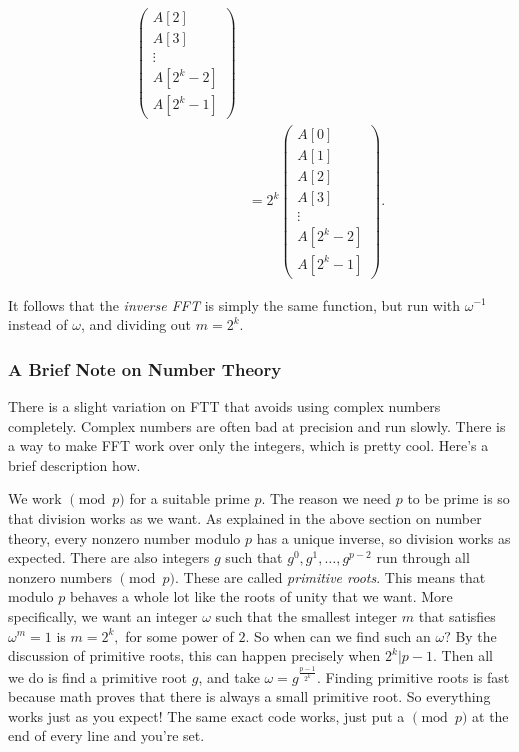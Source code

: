 \begin{align*}
\begin{pmatrix}
A[2] \\ 
A[3] \\
\vdots \\
A[2^k - 2] \\
A[2^k - 1]
\end{pmatrix}
\\
&=
2^k
\begin{pmatrix}
A[0] \\ 
A[1] \\ 
A[2] \\ 
A[3] \\
\vdots \\
A[2^k - 2] \\
A[2^k - 1]
\end{pmatrix}.
\end{align*}

\eject \pdfpagewidth=8.5in \pdfpageheight=11in

It follows that the \textit{inverse FFT} is simply the same function, but run with $\omega^{-1}$ instead of $\omega$, and dividing out $m=2^k$.

\subsubsection{A Brief Note on Number Theory}

There is a slight variation on FTT that avoids using complex numbers completely. Complex numbers are often bad at precision and run slowly. There is a way to make FFT work over only the integers, which is pretty cool. Here's a brief description how.

We work $\pmod{p}$ for a suitable prime $p$. The reason we need $p$ to be prime is so that division works as we want. As explained in the above section on number theory, every nonzero number modulo $p$ has a unique inverse, so division works as expected. There are also integers $g$ such that $g^0, g^1, \dots, g^{p-2}$ run through all nonzero numbers $\pmod{p}.$ These are called \emph{primitive roots}. This means that modulo $p$ behaves a whole lot like the roots of unity that we want. More specifically, we want an integer $\omega$ such that the smallest integer $m$ that satisfies $\omega^m = 1$ is $m = 2^k,$ for some power of $2.$ So when can we find such an $\omega?$ By the discussion of primitive roots, this can happen precisely when $2^k | p-1.$ Then all we do is find a primitive root $g$, and take $\omega = g^{\frac{p-1}{2^k}}.$ Finding primitive roots is fast because math proves that there is always a small primitive root. So everything works just as you expect! The same exact code works, just put a $\pmod{p}$ at the end of every line and you're set.
